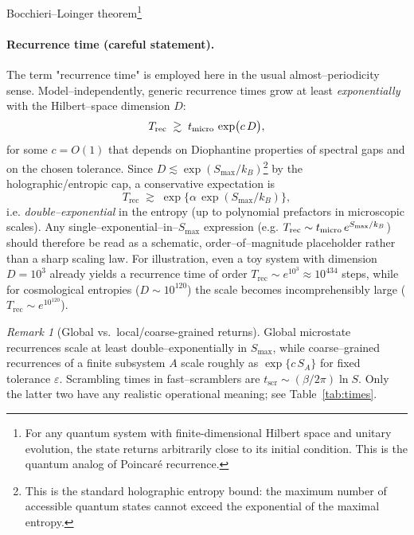 \documentclass[12pt]{article}
\newcommand{\Smax}{S_{\max}}
\newcommand{\Trec}{T_{\text{rec}}}
\newcommand{\tscr}{t_{\text{scr}}}
\theoremstyle{remark}
\newtheorem{remark}{Remark}
\begin{document}
Bocchieri--Loinger theorem\footnote{For any quantum system with finite-dimensional Hilbert space 
and unitary evolution, the state returns arbitrarily close to its initial condition. 
This is the quantum analog of Poincaré recurrence.}



\paragraph{Recurrence time (careful statement).}
The term "recurrence time" is employed here in the usual almost–periodicity sense. Model–independently, generic recurrence times grow at least \emph{exponentially} with the Hilbert–space dimension $D$:
\[
\Trec \;\gtrsim\; t_{\rm micro}\,\exp\!\big(c\,D\big),
\]
for some $c=O(1)$ that depends on Diophantine properties of spectral gaps and on the chosen tolerance.
Since $D \lesssim \exp(\Smax/k_B)$\footnote{This is the standard holographic entropy bound: the maximum number of accessible quantum states cannot exceed the exponential of the maximal entropy.} by the holographic/entropic cap, a conservative expectation is
\[
\Trec \;\gtrsim\; \exp\!\Big\{\alpha\,\exp(\Smax/k_B)\Big\},
\]
i.e. \emph{double–exponential} in the entropy (up to polynomial prefactors in microscopic scales).
Any single–exponential–in–$\Smax$ expression (e.g. $\Trec\sim t_{\rm micro}\,e^{\Smax/k_B}$) should therefore be read as a schematic, order–of–magnitude placeholder rather than a sharp scaling law. For illustration, even a toy system with dimension $D=10^3$ already yields a 
recurrence time of order $T_{\text{rec}} \sim e^{10^3} \approx 10^{434}$ steps, 
while for cosmological entropies ($D \sim 10^{120}$) the scale becomes 
incomprehensibly large ($T_{\text{rec}} \sim e^{10^{120}}$).


\begin{remark}[Global vs.\ local/coarse-grained returns]\label{rem:times}
Global microstate recurrences scale at least double–exponentially in $\Smax$, 
while coarse–grained recurrences of a finite subsystem $A$ scale roughly as 
$\exp\{c\,S_A\}$ for fixed tolerance $\varepsilon$. 
Scrambling times in fast–scramblers are $\tscr\sim (\beta/2\pi)\ln S$.
Only the latter two have any realistic operational meaning; see Table~\ref{tab:times}.
\end{remark}
\end{document}
